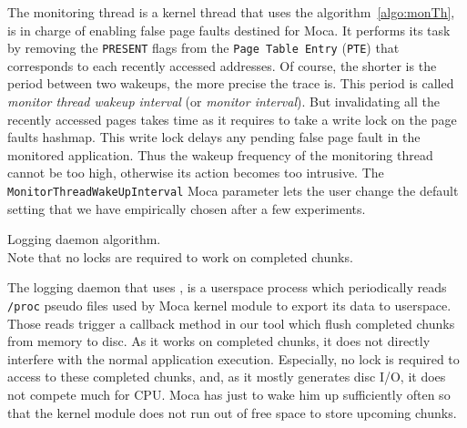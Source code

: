 The monitoring thread is a kernel thread that uses the algorithm~\ref{algo:monTh}, is in charge of enabling false page faults destined for \gls{Moca}.
It performs its task by removing the \texttt{PRESENT} flags from the \texttt{Page Table Entry} (\texttt{PTE}) that corresponds to each recently accessed addresses.
Of course, the shorter is the period between two wakeups, the more precise the trace is.
This period is called \emph{monitor thread wakeup interval} (or \emph{monitor interval}).
But invalidating all the recently accessed pages takes time as it requires to take a write lock on the page faults hashmap.
This write lock delays any pending false page fault in the monitored application.
Thus the wakeup frequency of the monitoring thread cannot be too high, otherwise its action becomes too intrusive.
The \texttt{MonitorThreadWakeUpInterval} \gls{Moca} parameter lets the user change the default setting that we have empirically chosen after a few experiments.

\begin{algorithm}[htb]
    \caption[Moca Logging daemon algorithm.]{Logging daemon algorithm.\\
        \footnotesize{Note that no locks are required to work on completed chunks.}}
    \label{alg:moca-log}
    \begin{algorithmic}[1]
                \State {}
                \State {}
                \EndFor
            \EndFor
            \State {}
        \EndWhile
    \end{algorithmic}
\end{algorithm}

The logging daemon that uses , is a userspace process which periodically reads \texttt{/proc} pseudo files used by \gls{Moca} kernel module to export its data to userspace.
Those reads trigger a callback method in our tool which flush completed chunks from memory to disc.
As it works on completed chunks, it does not directly interfere with the normal application execution.
Especially, no lock is required to access to these completed chunks, and, as it mostly generates disc I/O, it does not compete much for CPU.
\gls{Moca} has just to wake him up sufficiently often so that the kernel module does not run out of free space to store upcoming chunks.

